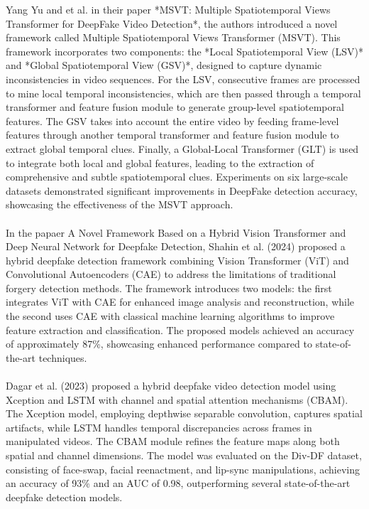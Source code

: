 Yang Yu and et al. \cite{df09} in their
paper *MSVT: Multiple Spatiotemporal Views Transformer for DeepFake Video Detection*, the authors introduced a novel framework called Multiple Spatiotemporal Views Transformer (MSVT). This framework incorporates two components: the *Local Spatiotemporal View (LSV)* and *Global Spatiotemporal View (GSV)*, designed to capture dynamic inconsistencies in video sequences. For the LSV, consecutive frames are processed to mine local temporal inconsistencies, which are then passed through a temporal transformer and feature fusion module to generate group-level spatiotemporal features. The GSV takes into account the entire video by feeding frame-level features through another temporal transformer and feature fusion module to extract global temporal clues. Finally, a Global-Local Transformer (GLT) is used to integrate both local and global features, leading to the extraction of comprehensive and subtle spatiotemporal clues. Experiments on six large-scale datasets demonstrated significant improvements in DeepFake detection accuracy, showcasing the effectiveness of the MSVT approach.\\\\

In the papaer A Novel Framework Based on a Hybrid Vision Transformer and Deep Neural Network for Deepfake Detection, Shahin et al. (2024) \cite{df02} proposed a hybrid deepfake detection framework combining Vision Transformer (ViT) and Convolutional Autoencoders (CAE) to address the limitations of traditional forgery detection methods. The framework introduces two models: the first integrates ViT with CAE for enhanced image analysis and reconstruction, while the second uses CAE with classical machine learning algorithms to improve feature extraction and classification. The proposed models achieved an accuracy of approximately 87\%, showcasing enhanced performance compared to state-of-the-art techniques.\\\\

Dagar et al. (2023) \cite{df05} proposed a hybrid deepfake video detection model using Xception and LSTM with channel and spatial attention mechanisms (CBAM). The Xception model, employing depthwise separable convolution, captures spatial artifacts, while LSTM handles temporal discrepancies across frames in manipulated videos. The CBAM module refines the feature maps along both spatial and channel dimensions. The model was evaluated on the Div-DF dataset, consisting of face-swap, facial reenactment, and lip-sync manipulations, achieving an accuracy of 93\% and an AUC of 0.98, outperforming several state-of-the-art deepfake detection models.\\\\

